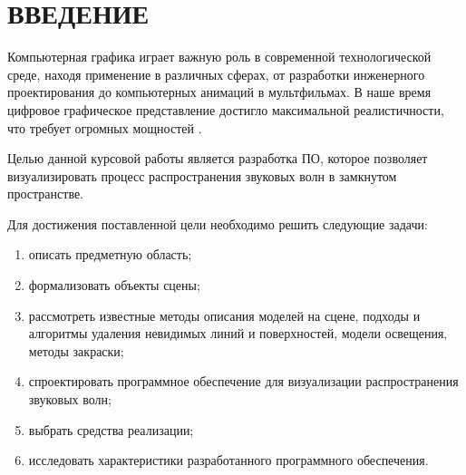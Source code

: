 \chapter*{ВВЕДЕНИЕ}

Компьютерная графика играет важную роль в современной технологической среде, находя применение в различных сферах, от разработки инженерного проектирования до компьютерных анимаций в мультфильмах.
В наше время цифровое графическое представление достигло максимальной реалистичности, что требует огромных мощностей \cite{usage}.

Целью данной курсовой работы является разработка ПО, которое позволяет визуализировать процесс распространения звуковых волн в замкнутом пространстве.

Для достижения поставленной цели необходимо решить следующие задачи:
\begin{enumerate}
	\item описать предметную область;
	\item формализовать объекты сцены;
	\item рассмотреть известные методы описания моделей на сцене, подходы и алгоритмы удаления невидимых линий и поверхностей, модели освещения, методы закраски;
	\item спроектировать программное обеспечение для визуализации распространения звуковых волн;
	\item выбрать средства реализации;
	\item исследовать характеристики разработанного программного обеспечения.
\end{enumerate}